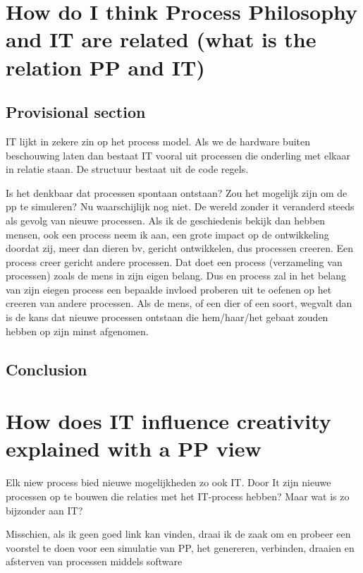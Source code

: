 \documentclass[a4paper]{Thesis}
\begin{document}
\chapter{How do I think Process Philosophy and IT are related (what is the relation PP and IT)}
\section{Provisional section}



IT lijkt in zekere zin op het process model. Als we de hardware buiten beschouwing laten dan bestaat IT vooral uit processen die onderling met elkaar in relatie staan. De structuur bestaat uit de code regels.

Is het denkbaar dat processen spontaan ontstaan? Zou het mogelijk zijn om de pp te simuleren?
Nu waarschijlijk nog niet.
De wereld zonder it veranderd steeds als gevolg van nieuwe processen.
 Als ik de geschiedenis bekijk dan hebben mensen, ook een process neem ik aan, een grote impact op de ontwikkeling doordat zij, meer dan dieren bv, gericht ontwikkelen, dus processen creeren. Een process creer gericht andere processen.
Dat doet een process (verzameling van processen) zoals de mens in zijn eigen belang. Dus en process zal in het belang van zijn eiegen process een bepaalde invloed proberen uit te oefenen op het creeren van andere processen. Als de mens, of een dier of een soort, wegvalt dan is de kans dat nieuwe processen ontstaan die hem/haar/het gebaat zouden hebben op zijn minst afgenomen.


\section{Conclusion}

\chapter{How does IT influence creativity explained with a PP view}


Elk niew process bied nieuwe mogelijkheden zo ook IT. Door It zijn nieuwe processen op te bouwen die relaties met het IT-process hebben? Maar wat is zo bijzonder aan IT?

Misschien, als ik geen goed link kan vinden, draai ik de zaak om en probeer een voorstel te doen voor een simulatie van PP, het genereren, verbinden, draaien en afsterven van processen middels software
\end{document}
